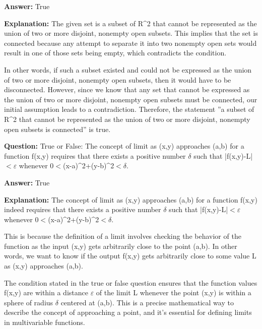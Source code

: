 \documentclass{article}
\begin{document}
                \textbf{Answer:} True

                \textbf{Explanation:} The given set is a subset of R{\textasciicircum}2 that cannot be represented as the union of two or more disjoint, nonempty open subsets. This implies that the set is connected because any attempt to separate it into two nonempty open sets would result in one of those sets being empty, which contradicts the condition.

In other words, if such a subset existed and could not be expressed as the union of two or more disjoint, nonempty open subsets, then it would have to be disconnected. However, since we know that any set that cannot be expressed as the union of two or more disjoint, nonempty open subsets must be connected, our initial assumption leads to a contradiction. Therefore, the statement ''a subset of R{\textasciicircum}2 that cannot be represented as the union of two or more disjoint, nonempty open subsets is connected'' is true.
                
                \vspace{0.5cm} 
        
            
                \textbf {Question:} True or False: The concept of limit as (x,y) approaches (a,b) for a function f(x,y) requires that there exists a positive number \ensuremath{\delta} such that |f(x,y)-L|\ensuremath{<}\ensuremath{\varepsilon} whenever 0\ensuremath{<}(x-a){\textasciicircum}2+(y-b){\textasciicircum}2\ensuremath{<}\ensuremath{\delta}.
                
                \textbf{Answer:} True

                \textbf{Explanation:} The concept of limit as (x,y) approaches (a,b) for a function f(x,y) indeed requires that there exists a positive number \ensuremath{\delta} such that |f(x,y)-L|\ensuremath{<}\ensuremath{\varepsilon} whenever 0\ensuremath{<}(x-a){\textasciicircum}2+(y-b){\textasciicircum}2\ensuremath{<}\ensuremath{\delta}.

This is because the definition of a limit involves checking the behavior of the function as the input (x,y) gets arbitrarily close to the point (a,b). In other words, we want to know if the output f(x,y) gets arbitrarily close to some value L as (x,y) approaches (a,b).

The condition stated in the true or false question ensures that the function values f(x,y) are within a distance \ensuremath{\varepsilon} of the limit L whenever the point (x,y) is within a sphere of radius \ensuremath{\delta} centered at (a,b). This is a precise mathematical way to describe the concept of approaching a point, and it's essential for defining limits in multivariable functions.
                
\end{document}
